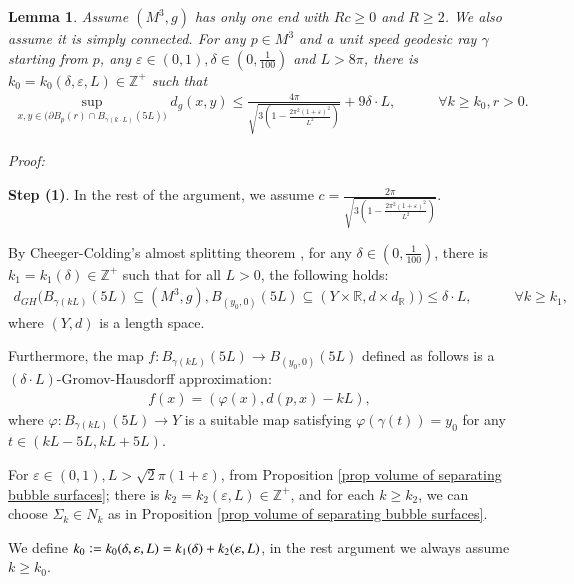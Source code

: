 \documentclass[11pt]{amsart}
\newtheorem{lemma}[theorem]{Lemma}
\numberwithin{equation}{section}
\def\pf{{\it Proof:}~}
\begin{document}
\begin{lemma}\label{lem diam of partial geod spheres}
{Assume $(M^3, g)$ has only one end with $Rc\geq 0$ and $R\geq 2$. We also assume it is simply connected.  For any $p\in M^3$ and a unit speed geodesic ray $\gamma$ starting from $p$,  any $ \varepsilon\in (0,  1),  \delta\in (0,\frac{1}{100})$ and $L> 8\pi$,  there is $k_0= k_0(\delta, \varepsilon, L)\in \mathbb{Z}^+$ such that 
\begin{align}
\sup_{x, y\in \big(\partial B_p(r)\cap B_{\gamma(k\cdot L)}(5L)\big)}d_g(x, y)\leq \frac{4\pi}{\sqrt{3(1- \frac{2\pi^2(1+ \varepsilon)^2}{L^2})}}+ 9\delta\cdot L, \quad \quad \quad \forall k\geq k_0, r> 0.  \nonumber
\end{align}
}
\end{lemma}

\pf
{\textbf{Step (1)}.  In the rest of the argument,  we assume $\displaystyle c= \frac{2\pi}{\sqrt{3(1- \frac{2\pi^2(1+ \varepsilon)^2}{L^2})}}$.  

By Cheeger-Colding's almost splitting theorem \cite[Theorem $6.62$]{CC-Ann},  for any $\delta\in (0,  \frac{1}{100})$,  there is $k_1= k_1(\delta)\in \mathbb{Z}^+$ such that for all $L> 0$, the following holds:
\begin{align}
d_{GH}\Big(B_{\gamma(kL)}(5L)\subseteq (M^3, g),  B_{(y_0,  0)}(5L)\subseteq (Y\times \mathbb{R},  d\times d_{\mathbb{R}})\Big)\leq \delta\cdot L, \quad \quad \quad \forall k\geq k_1, \nonumber 
\end{align}
where $(Y, d)$ is a length space.

Furthermore,  the map $f: B_{\gamma(kL)}(5L)\rightarrow B_{(y_0,  0)}(5L)$ defined as follows is a $(\delta\cdot L)$-Gromov-Hausdorff approximation:
\begin{align}
f(x)= (\varphi(x),  d(p, x)- kL),  \nonumber 
\end{align}
where $\varphi: B_{\gamma(kL)}(5L)\rightarrow Y$ is a suitable map satisfying $\varphi(\gamma(t))= y_0$ for any $t\in (kL- 5L, kL+ 5L)$.  

For $\varepsilon\in (0, 1), L> \sqrt{2}\pi(1+ \varepsilon)$, from Proposition \ref{prop volume of separating bubble surfaces}; there is $k_2= k_2(\varepsilon, L)\in \mathbb{Z}^+$, and for each $k\geq k_2$, we can choose $\Sigma_k\in N_k$ as in Proposition \ref{prop volume of separating bubble surfaces}. 

We define $k_0\vcentcolon= k_0(\delta, \varepsilon, L)= k_1(\delta)+ k_2(\varepsilon, L)$, in the rest argument we always assume $k\geq k_0$.

}
\end{document}
